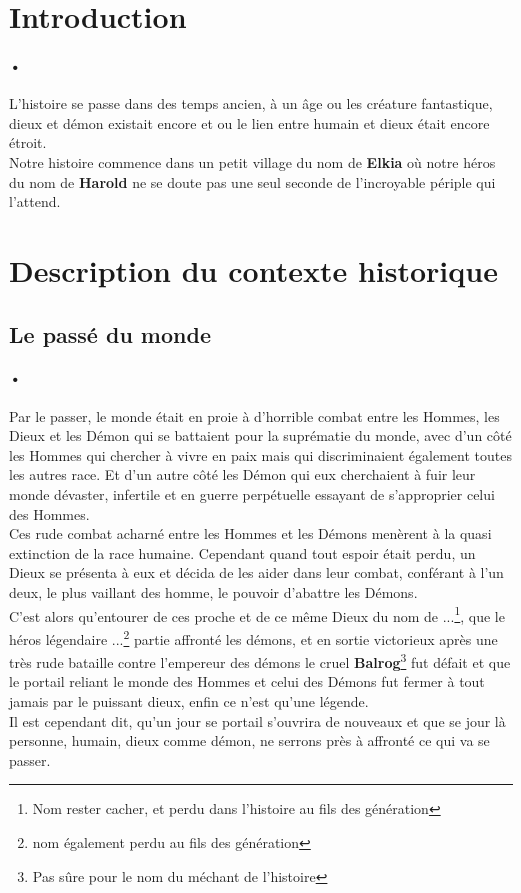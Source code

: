 \section{Introduction}

\paragraph{•}L'histoire se passe dans des temps ancien, à un âge ou les créature fantastique, dieux et démon existait encore et ou le lien entre humain et dieux était encore étroit.\\
Notre histoire commence dans un petit village du nom de \textbf{Elkia} où notre héros du nom de \textbf{Harold} ne se doute pas une seul seconde de l'incroyable périple qui l'attend.
\newpage


\section{Description du contexte historique}
\subsection{Le passé du monde}
\paragraph{•}Par le passer, le monde était en proie à d'horrible combat entre les Hommes, les Dieux et les Démon qui se battaient pour la suprématie du monde, avec d'un côté les Hommes qui chercher à vivre en paix mais qui discriminaient également toutes les autres race. Et d'un autre côté les Démon qui eux cherchaient à fuir leur monde dévaster, infertile et en guerre perpétuelle essayant de s'approprier celui des Hommes.\\
Ces rude combat acharné entre les Hommes et les Démons menèrent à la quasi extinction de la race humaine. Cependant quand tout espoir était perdu, un Dieux se présenta à eux et décida de les aider dans leur combat, conférant à l'un deux, le plus vaillant des homme, le pouvoir d'abattre les Démons.\\
C'est alors qu'entourer de ces proche et de ce même Dieux du nom de ...\footnote{Nom rester cacher, et perdu dans l'histoire au fils des génération}, que le héros légendaire ...\footnote{nom également perdu au fils des génération} partie affronté les démons, et en sortie victorieux après une très rude bataille contre l'empereur des démons le cruel \textbf{Balrog}\footnote{Pas sûre pour le nom du méchant de l'histoire} fut défait et que le portail reliant le monde des Hommes et celui des Démons fut fermer à tout jamais par le puissant dieux, enfin ce n'est qu'une légende.\\
Il est cependant dit, qu'un jour se portail s'ouvrira de nouveaux et que se jour là personne, humain, dieux comme démon, ne serrons près à affronté ce qui va se passer.

